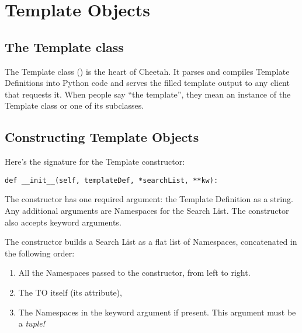 \section{Template Objects}
\label{TSobjects}

\subsection{The Template class}

The Template class () is the heart of Cheetah.
It parses and compiles Template Definitions into Python code and serves the
filled template output to any client that requests it.  When people say ``the
template'', they mean an instance of the Template class or one of its
subclasses.


\subsection{Constructing Template Objects}

Here's the signature for the Template constructor:

\begin{verbatim}
def __init__(self, templateDef, *searchList, **kw):
\end{verbatim}

The constructor has one required argument: the Template Definition as
a string.  Any additional arguments are Namespaces for the Search List.  The
constructor also accepts keyword arguments.

The constructor builds a Search List as a flat list of Namespaces,
concatenated in the following order:

\begin{enumerate}

\item  All the Namespaces passed to the constructor, from left to right.

\item  The TO itself (its  attribute), 

\item  The Namespaces in the keyword argument  if present.  
     This argument must be a \em{tuple}!  

\end{enumerate}


